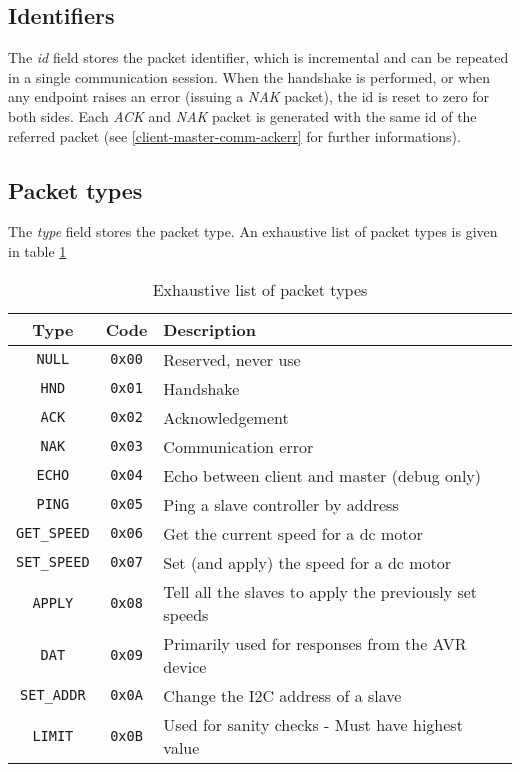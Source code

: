 \subsection{Identifiers}
The \emph{id} field stores the packet identifier, which is incremental and can
be repeated in a single communication session. When the handshake is performed,
or when any endpoint raises an error (issuing a \emph{NAK} packet), the id is
reset to zero for both sides. Each \emph{ACK} and \emph{NAK} packet is
generated with the same id of the referred packet (see
\ref{client-master-comm-ackerr} for further informations).

\subsection{Packet types}
The \emph{type} field stores the packet type. An exhaustive list of packet
types is given in table \ref{tab:packet-types}

\begin{table}[bh]
  \begin{tabularx}{\textwidth}{c c X}
    \toprule
    Type & Code & Description \\
    \midrule
    \texttt{NULL}       & \texttt{0x00} & Reserved, never use \\
    \texttt{HND}        & \texttt{0x01} & Handshake \\
    \texttt{ACK}        & \texttt{0x02} & Acknowledgement \\
    \texttt{NAK}        & \texttt{0x03} & Communication error \\
    \texttt{ECHO}       & \texttt{0x04} & Echo between client and master (debug only)\\
    \texttt{PING}       & \texttt{0x05} & Ping a slave controller by address \\
    \texttt{GET\_SPEED} & \texttt{0x06} & Get the current speed for a dc motor \\
    \texttt{SET\_SPEED} & \texttt{0x07} & Set (and apply) the speed for a dc motor \\
    \texttt{APPLY}      & \texttt{0x08} & Tell all the slaves to apply the previously set speeds \\
    \texttt{DAT}        & \texttt{0x09} & Primarily used for responses from the AVR device \\
    \texttt{SET\_ADDR}  & \texttt{0x0A} & Change the I2C address of a slave \\
    \texttt{LIMIT}      & \texttt{0x0B} & Used for sanity checks - Must have highest value \\
    \bottomrule
  \end{tabularx}
  \caption{Exhaustive list of packet types}
  \label{tab:packet-types}
\end{table}


